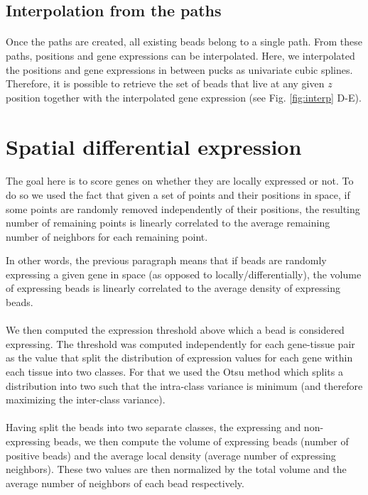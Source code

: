 \documentclass[10pt,a4paper]{article}
\begin{document}
\subsection{Interpolation from the paths}
\paragraph{}Once the paths are created, all existing beads belong to a single path.
From these paths, positions and gene expressions can be interpolated.
Here, we interpolated the positions and gene expressions in between pucks as univariate cubic splines. Therefore, it is possible to retrieve the set of beads that live at any given \(z\) position together with the interpolated gene expression (see Fig. \ref{fig:interp} D-E).
\section{Spatial differential expression}
\paragraph{}The goal here is to score genes on whether they are locally expressed or not.
To do so we used the fact that given a set of points and their positions in space, if some points are randomly removed independently of their positions, the resulting number of remaining points is linearly correlated to the average remaining number of neighbors for each remaining point.

In other words, the previous paragraph means that if beads are randomly expressing a given gene in space (as opposed to locally/differentially), the volume of expressing beads is linearly correlated to the average density of expressing beads.
\paragraph{}We then computed the expression threshold above which a bead is considered expressing.
The threshold was computed independently for each gene-tissue pair as the value that split the distribution of expression values for each gene within each tissue into two classes. For that we used the Otsu method \citep{Otsu:1979} which splits a distribution into two such that the intra-class variance is minimum (and therefore maximizing the inter-class variance).
\paragraph{}Having split the beads into two separate classes, the expressing and non-expressing beads, we then compute the volume of expressing beads (number of positive beads) and the average local density (average number of expressing neighbors). These two values are then normalized by the total volume and the average number of neighbors of each bead respectively.
\end{document}
